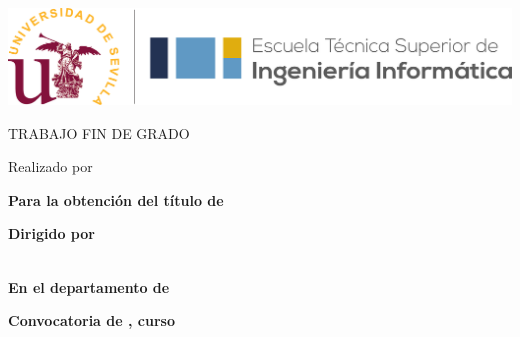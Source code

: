 \thispagestyle{empty} %
\begin{center}

\vspace*{1cm}

\includegraphics[width=\textwidth]{figures/etsii_us.png}

\vspace*{3cm}
\begin{large}
TRABAJO FIN DE GRADO
\end{large}

\vspace*{0.1in}
\textbf{\huge \tfgTitle}

\vspace*{.2in}

{\large Realizado por}\\
\textbf{\Large \tfgAuthors}

\vspace*{3cm}

\textbf{Para la obtención del título de}\\
{\large \tfgDegree}

\vspace*{0.2in}

\textbf{Dirigido por}\\
{\large \tfgSupervisor}\\

\vspace*{0.2in}

\textbf{En el departamento de}\\
{\large \tfgDepartment}

\vspace*{.6in}
\textbf{\Large Convocatoria de \tfgMonth, curso \tfgYear}

\end{center}

\ifdefined\tfgDedication
    \newpage
    \thispagestyle{empty}
    
    \vspace*{\fill}
    \begin{center}
    \textit{\tfgDedication}
    \end{center}
    \vspace*{\fill}
\fi

\clearpage\setcounter{page}{1} %
